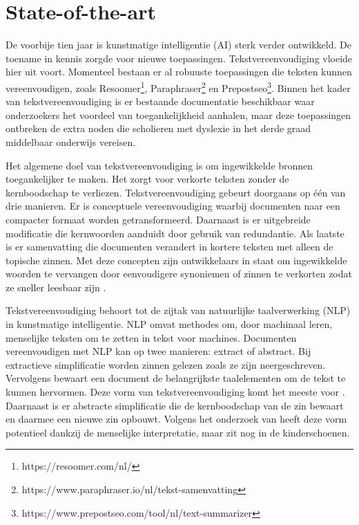 
\section{State-of-the-art}%
\label{sec:state-of-the-art}

De voorbije tien jaar is kunstmatige intelligentie (AI) sterk verder ontwikkeld. De toename in kennis zorgde voor nieuwe toepassingen. Tekstvereenvoudiging vloeide hier uit voort. Momenteel bestaan er al robuuste toepassingen die teksten kunnen vereenvoudigen, zoals Resoomer\footnote{https://resoomer.com/nl/}, Paraphraser\footnote{https://www.paraphraser.io/nl/tekst-samenvatting} en Prepostseo\footnote{https://www.prepostseo.com/tool/nl/text-summarizer}. Binnen het kader van tekstvereenvoudiging is er bestaande documentatie beschikbaar waar onderzoekers het voordeel van toegankelijkheid aanhalen, maar deze toepassingen ontbreken de extra noden die scholieren met dyslexie in het derde graad middelbaar onderwijs vereisen.

Het algemene doel van tekstvereenvoudiging is om ingewikkelde bronnen toegankelijker te maken. Het zorgt voor verkorte teksten zonder de kernboodschap te verliezen. Tekstvereenvoudiging gebeurt doorgaans op één van drie manieren. Er is conceptuele vereenvoudiging waarbij documenten naar een compacter formaat worden getransformeerd. Daarnaast is er uitgebreide modificatie die kernwoorden aanduidt door gebruik van redundantie. Als laatste is er samenvatting die documenten verandert in kortere teksten met alleen de topische zinnen. Met deze concepten zijn ontwikkelaars in staat om ingewikkelde woorden te vervangen door eenvoudigere synoniemen of zinnen te verkorten zodat ze sneller leesbaar zijn \autocite{Siddharthan2014}.

Tekstvereenvoudiging behoort tot de zijtak van natuurlijke taalverwerking (NLP) in kunstmatige intelligentie. NLP omvat methodes om, door machinaal leren, menselijke teksten om te zetten in tekst voor machines. Documenten vereenvoudigen met NLP kan op twee manieren: extract of abstract. Bij extractieve simplificatie worden zinnen gelezen zoals ze zijn neergeschreven. Vervolgens bewaart een document de belangrijkste taalelementen om de tekst te kunnen hervormen. Deze vorm van tekstvereenvoudiging komt het meeste voor \autocite{Sciforce2020}. Daarnaast is er abstracte simplificatie die de kernboodschap van de zin bewaart en daarmee een nieuwe zin opbouwt. Volgens het onderzoek van \textcite{Chowdhary2020} heeft deze vorm potentieel dankzij de menselijke interpretatie, maar zit nog in de kinderschoenen.

